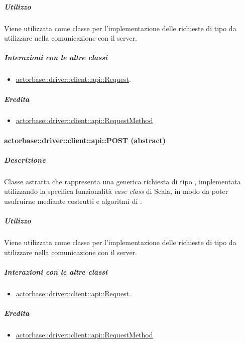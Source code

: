 \documentclass{scalatekids-article}
\begin{document}
\subparagraph{Utilizzo}

Viene utilizzata come classe per l'implementazione delle richieste 
di tipo  da utilizzare nella comunicazione con il server.

\subparagraph{Interazioni con le altre classi}

\begin{itemize}
\item \hyperref[sec:actorbase::driver::client::api::Request]{actorbase::driver::client::api::Request}.
\end{itemize}

\subparagraph{Eredita}

\begin{itemize}
\item \hyperref[sec:actorbase::driver::client::api::RequestMethod]{actorbase::driver::client::api::RequestMethod}
\end{itemize}


\paragraph{actorbase::driver::client::api::POST (abstract)}
\label{sec:actorbase::driver::client::api::POST}

\subparagraph{Descrizione}

Classe astratta che rappresenta una generica richiesta  di tipo
, implementata utilizzando la specifica funzionalità \textit{case
  class} di Scala, in modo da poter usufruirne mediante costrutti e algoritmi di
.

\subparagraph{Utilizzo}

Viene utilizzata come classe per l'implementazione delle richieste 
di tipo  da utilizzare nella comunicazione con il server.

\subparagraph{Interazioni con le altre classi}

\begin{itemize}
\item \hyperref[sec:actorbase::driver::client::api::Request]{actorbase::driver::client::api::Request}.
\end{itemize}

\subparagraph{Eredita}

\begin{itemize}
\item \hyperref[sec:actorbase::driver::client::api::RequestMethod]{actorbase::driver::client::api::RequestMethod}
\end{itemize}
\end{document}
